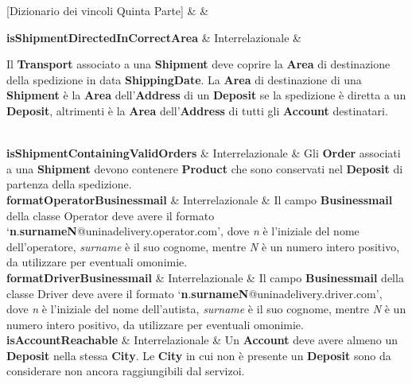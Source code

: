 [Dizionario dei vincoli Quinta Parte]{ &  & }{

  \textbf{isShipmentDirectedInCorrectArea} & Interrelazionale &
  {\footnotesize

  Il \textbf{Transport} associato a una \textbf{Shipment} deve coprire la \textbf{Area} di destinazione della spedizione in data \textbf{ShippingDate}.
  La \textbf{Area} di destinazione di una \textbf{Shipment} è la \textbf{Area} dell'\textbf{Address} di un \textbf{Deposit} se la spedizione è diretta a un \textbf{Deposit}, altrimenti è la \textbf{Area} dell'\textbf{Address} di tutti gli \textbf{Account} destinatari.
  
  }\\

  \textbf{isShipmentContainingValidOrders} & Interrelazionale &
  {\footnotesize 
  Gli \textbf{Order} associati a una \textbf{Shipment} devono contenere \textbf{Product} che sono conservati nel \textbf{Deposit} di partenza della spedizione.
  }\\

  \textbf{formatOperatorBusinessmail} & Interrelazionale &
  {\footnotesize
  Il campo \textbf{Businessmail} della classe Operator deve avere il formato `\textbf{n}.\textbf{surnameN}@uninadelivery.operator.com', dove \textit{n} è l'iniziale del nome dell'operatore, \textit{surname} è il suo cognome, mentre \textit{N} è un numero intero positivo, da utilizzare per eventuali omonimie.
  }\\
  
  \textbf{formatDriverBusinessmail} & Interrelazionale &
  {\footnotesize
  Il campo \textbf{Businessmail} della classe Driver deve avere il formato `\textbf{n}.\textbf{surnameN}@uninadelivery.driver.com', dove \textit{n} è l'iniziale del nome dell'autista, \textit{surname} è il suo cognome, mentre \textit{N} è un numero intero positivo, da utilizzare per eventuali omonimie.
  }\\

  \textbf{isAccountReachable} & Interrelazionale &
  {\footnotesize
  Un \textbf{Account} deve avere almeno un \textbf{Deposit} nella stessa \textbf{City}. Le \textbf{City} in cui non è presente un \textbf{Deposit} sono da considerare non ancora raggiungibili dal servizoi.
  }\\
}